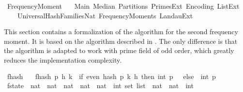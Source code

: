 %
\begin{isabellebody}%
%
%
\isadelimdocument
%
\endisadelimdocument
%
\isatagdocument
%
\isamarkuptrue%
%
\endisatagdocument
{\isafolddocument}%
%
\isadelimdocument
%
\endisadelimdocument
%
\isadelimtheory
%
\endisadelimtheory
%
\isatagtheory
{}\isamarkupfalse%
\ Frequency{\isacharunderscore}{\kern0pt}Moment{\isacharunderscore}{\kern0pt}{}\isanewline
\ \ \ Main\ Median\ Partitions\ Primes{\isacharunderscore}{\kern0pt}Ext\ Encoding\ List{\isacharunderscore}{\kern0pt}Ext\ \isanewline
\ \ \ \ Universal{\isacharunderscore}{\kern0pt}Hash{\isacharunderscore}{\kern0pt}Families{\isacharunderscore}{\kern0pt}Nat\ Frequency{\isacharunderscore}{\kern0pt}Moments\ Landau{\isacharunderscore}{\kern0pt}Ext\isanewline
{}%
\endisatagtheory
{\isafoldtheory}%
%
\isadelimtheory
%
\endisadelimtheory
%
\begin{isamarkuptext}%
This section contains a formalization of the algorithm for the second frequency moment.
It is based on the algorithm described in \cite[]{alon1999}.
The only difference is that the algorithm is adapted to work with prime field of odd order, which
greatly reduces the implementation complexity.%
\end{isamarkuptext}\isamarkuptrue%
\isamarkupfalse%
\ f{}{\isacharunderscore}{\kern0pt}hash\ \isanewline
\ \ {\isachardoublequoteopen}f{}{\isacharunderscore}{\kern0pt}hash\ p\ h\ k\ {\isacharequal}{\kern0pt}\ {\isacharparenleft}{\kern0pt}if\ even\ {\isacharparenleft}{\kern0pt}hash\ p\ k\ h{\isacharparenright}{\kern0pt}\ then\ int\ p\ {\isacharminus}{\kern0pt}\ {}\ else\ {\isacharminus}{\kern0pt}\ int\ p\ {\isacharminus}{\kern0pt}\ {}{\isacharparenright}{\kern0pt}{\isachardoublequoteclose}\isanewline
\isanewline
{}\isamarkupfalse%
\ f{}{\isacharunderscore}{\kern0pt}state\ {\isacharequal}{\kern0pt}\ {\isachardoublequoteopen}nat\ {\isasymtimes}\ nat\ {\isasymtimes}\ nat\ {\isasymtimes}\ {\isacharparenleft}{\kern0pt}nat\ {\isasymtimes}\ nat\ {\isasymRightarrow}\ int\ set\ list{\isacharparenright}{\kern0pt}\ {\isasymtimes}\ {\isacharparenleft}{\kern0pt}nat\ {\isasymtimes}\ nat\ {\isasymRightarrow}\ int{\isacharparenright}{\kern0pt}{\isachardoublequoteclose}\isanewline
\isanewline
{}\isamarkupfalse%

\end{isabellebody}
